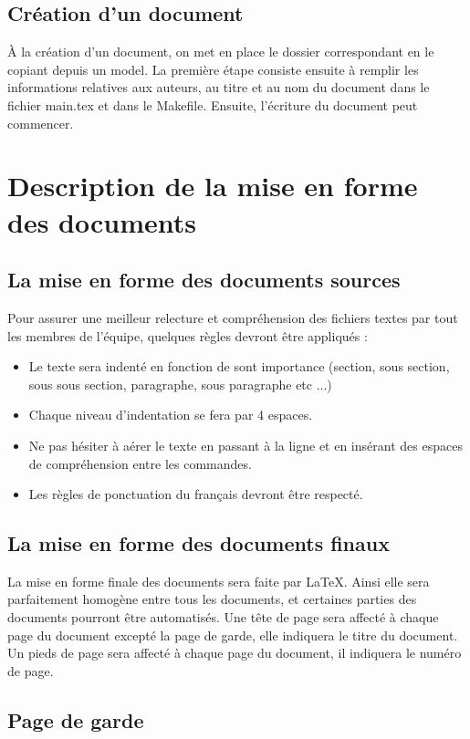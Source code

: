 \subsection{Création d'un document}

\`A la création d'un document, on met en place le dossier correspondant en le copiant depuis un model.
La première étape consiste ensuite à remplir les informations relatives aux auteurs, au titre et au nom du document dans le fichier main.tex et dans le Makefile.
Ensuite, l'écriture du document peut commencer.

\section{Description de la mise en forme des documents}

\subsection{La mise en forme des documents sources}
    Pour assurer une meilleur relecture et compréhension des fichiers textes par tout les membres de l'équipe, quelques règles devront être appliqués :
    \begin{itemize}
        \item Le texte sera indenté en fonction de sont importance (section, sous section, sous sous section, paragraphe, sous paragraphe etc ...)
        \item Chaque niveau d'indentation se fera par 4 espaces.
        \item Ne pas hésiter à aérer le texte en passant à la ligne et en insérant des espaces de compréhension entre les commandes.
        \item Les règles de ponctuation du français devront être respecté.
    \end{itemize}

\subsection{La mise en forme des documents finaux}
La mise en forme finale des documents sera faite par LaTeX.
Ainsi elle sera parfaitement homogène entre tous les documents, et certaines parties des documents pourront être automatisés.
Une tête de page sera affecté à chaque page du document excepté la page de garde, elle indiquera le titre du document.
Un pieds de page sera affecté à chaque page du document, il indiquera le numéro de page.

\subsection{Page de garde}

